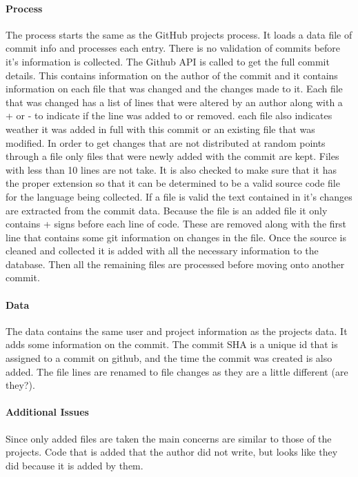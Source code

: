 \documentclass{article}
\begin{document}
\paragraph{Process}
The process starts the same as the GitHub projects process. It loads a data file of commit info and processes each entry. There is no validation of commits before it's information is collected. The Github API is called to get the full commit details. This contains information on the author of the commit and it contains information on each file that was changed and the changes made to it. Each file that was changed has a list of lines that were altered by an author along with a + or - to indicate if the line was added to or removed. each file also indicates weather it was added in full with this commit or an existing file that was modified. In order to get changes that are not distributed at random points through a file only files that were newly added with the commit are kept. Files with less than 10 lines are not take. It is also checked to make sure that it has the proper extension so that it can be determined to be a valid source code file for the language being collected. If a file is valid the text contained in it's changes are extracted from the commit data. Because the file is an added file it only contains + signs before each line of code. These are removed along with the first line that contains some git information on changes in the file. Once the source is cleaned and collected it is added with all the necessary information to the database. Then all the remaining files are processed before moving onto another commit.

\paragraph{Data}
The data contains the same user and project information as the projects data. It adds some information on the commit. The commit SHA is a unique id that is assigned to a commit on github, and the time the commit was created is also added. The file lines are renamed to file changes as they are a little different (are they?).

\paragraph{Additional Issues}
Since only added files are taken the main concerns are similar to those of the projects. Code that is added that the author did not write, but looks like they did because it is added by them.
\end{document}
